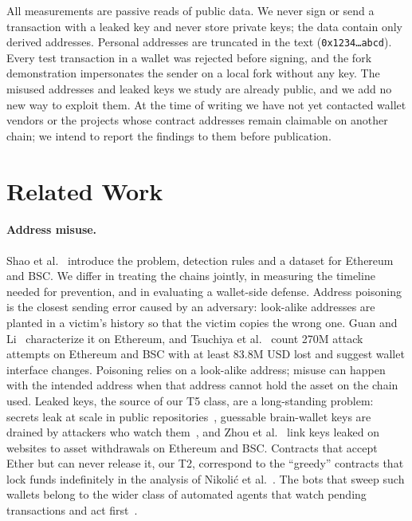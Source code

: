 \documentclass[runningheads]{llncs}
\begin{document}
All measurements are passive reads of public data. We never sign or send a
transaction with a leaked key and never store private keys; the data contain only
derived addresses. Personal addresses are truncated in the text
(\texttt{0x1234\ldots abcd}). Every test transaction in a wallet was rejected before signing, and the
fork demonstration impersonates the sender on a local fork without any key.
The misused addresses and leaked keys we study are already public, and we add
no new way to exploit them. At the time of writing we have not yet contacted
wallet vendors or the projects whose contract addresses remain claimable on
another chain; we intend to report the findings to them before publication.

\section{Related Work}
\label{sec:related}
\paragraph{Address misuse.} Shao et al.~\cite{shao2026lost} introduce the
problem, detection rules and a dataset for Ethereum and BSC. We differ in
treating the chains jointly, in measuring the timeline needed for prevention,
and in evaluating a wallet-side defense. Address poisoning is the closest
sending error caused by an adversary: look-alike addresses are planted in a
victim's history so that the victim copies the wrong one. Guan and
Li~\cite{guan2024poisoning} characterize it on Ethereum, and Tsuchiya et
al.~\cite{tsuchiya2025poisoning} count 270M attack attempts on Ethereum and BSC
with at least 83.8M USD lost and suggest wallet interface changes. Poisoning
relies on a look-alike address; misuse can happen with the intended address
when that address cannot hold the asset on the chain used. Leaked keys, the source of our T5
class, are a long-standing problem: secrets leak at scale in public
repositories~\cite{meli2019git}, guessable brain-wallet keys are drained by
attackers who watch them~\cite{vasek2016brain}, and Zhou et
al.~\cite{zhou2024keyleak} link keys leaked on websites to asset withdrawals on
Ethereum and BSC. Contracts that accept Ether but can never release it, our T2,
correspond to the ``greedy'' contracts that lock funds indefinitely in the
analysis of Nikoli\'c et al.~\cite{nikolic2018maian}. The bots that sweep such wallets belong to the wider class of
automated agents that watch pending transactions and act first~\cite{daian2020flash,torres2021frontrunner}.
\end{document}
